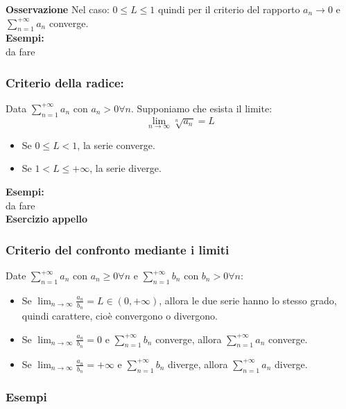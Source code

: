 \documentclass[../main.tex]{subfiles}
\begin{document}
\textbf{Osservazione}
Nel caso: $0 \leq L \leq 1$ quindi per il criterio del rapporto $a_n\to 0$ e
$\sum_{n=1}^{+\infty} a_n$ converge.\\
\textbf{Esempi:}\\
da fare

\subsubsection{Criterio della radice:} Data $\sum_{n=1}^{+\infty}a_n$ con $a_n > 0 \forall n$. Supponiamo che esista
il limite:
\[
    \lim_{n\to\infty}\sqrt[n]{a_n} = L
\]
\begin{itemize}
    \item Se $0\leq L < 1$, la serie converge.
    \item Se $1 < L \leq +\infty$, la serie diverge.

\end{itemize}
\textbf{Esempi:}\\
da fare\\
\textbf{Esercizio appello}\\
\subsubsection{Criterio del confronto mediante i limiti}
Date $\sum_{n=1}^{+\infty}a_n$ con $a_n \geq 0 \forall n$ e
$\sum_{n=1}^{+\infty}b_n$ con $b_n > 0 \forall n$:
\begin{itemize}
    \item Se $\lim_{n\to\infty}\frac{a_n}{b_n} = L \in (0,+\infty)$, allora le due serie
          hanno lo stesso grado, quindi carattere, cioè convergono o divergono.
    \item Se $\lim_{n\to\infty}\frac{a_n}{b_n} = 0$ e $\sum_{n=1}^{+\infty}b_n$ converge,
          allora $\sum_{n=1}^{+\infty}a_n$ converge.
    \item Se $\lim_{n\to\infty}\frac{a_n}{b_n} = +\infty$ e $\sum_{n=1}^{+\infty}b_n$
          diverge, allora $\sum_{n=1}^{+\infty}a_n$ diverge.
\end{itemize}

\subsubsection{Esempi}
\end{document}
